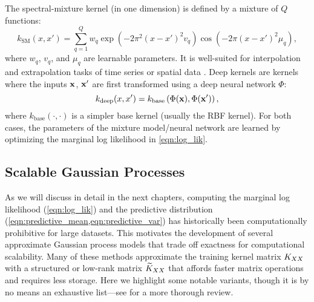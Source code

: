 The spectral-mixture kernel (in one dimension) is defined by a mixture of $Q$ functions:
%
\[
  k_\text{SM} (x, x') = \sum_{q=1}^Q w_q
    \exp \left( -2 \pi^2 (x - x')^2 v_q \right)
    \cos \left( -2 \pi (x - x')^2 \mu_q \right),
\]
%
where $w_q$, $v_q$, and $\mu_q$ are learnable parameters.
It is well-suited for interpolation and extrapolation tasks of time series or spatial data \cite{wilson2013gaussian}.
Deep kernels \cite{wilson2016deep,wilson2016stochastic,calandra2016manifold} are kernels where the inputs $\mathbf{x}$, $\mathbf{x}'$ are first transformed using a deep neural network $\Phi$:
%
\[
  k_\text{deep} (x, x') = k_\text{base} \left( \Phi(\mathbf{x}), \Phi(\mathbf{x}') \right),
\]
where $k_\text{base}(\cdot, \cdot)$ is a simpler base kernel (usually the RBF kernel).
For both cases, the parameters of the mixture model/neural network are learned by optimizing the marginal log likelihood in \cref{eqn:log_lik}.







\subsection{Scalable Gaussian Processes}
\label{sec:approx_gps}

As we will discuss in detail in the next chapters, computing the marginal log likelihood (\cref{eqn:log_lik}) and the predictive distribution (\cref{eqn:predictive_mean,eqn:predictive_var}) has historically been computationally prohibitive for large datasets.
This motivates the development of several approximate Gaussian process models \citep[e.g.][]{quinonero2005unifying,snelson2006sparse,rahimi2008random,titsias2009variational,hensman2013gaussian,wilson2015kernel,izmailov2018scalable,gardner2018product,evans2018scalable} that trade off exactness for computational scalability.
Many of these methods approximate the training kernel matrix $K_{XX}$ with a structured or low-rank matrix $\widetilde{K}_{XX}$ that affords faster matrix operations and requires less storage.
Here we highlight some notable variants, though it is by no means an exhaustive list---see \cite{liu2018gaussian} for a more thorough review.


